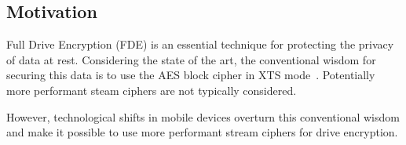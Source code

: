 \documentclass[a0,portrait]{a0poster}
\begin{document}
\begin{multicols}{2}
\color{SaddleBrown} %

\section*{Motivation}

Full Drive Encryption (FDE) is an essential technique for protecting the privacy
of data at rest. Considering the state of the art, the conventional wisdom for
securing this data is to use the AES block cipher in XTS mode~\cite{NISTXTS}.
Potentially more performant steam ciphers are not typically considered.

However, technological shifts in mobile devices overturn this conventional
wisdom and make it possible to use more performant stream ciphers for drive
encryption.

\vspace{0.5cm}


\end{multicols}
\end{document}

